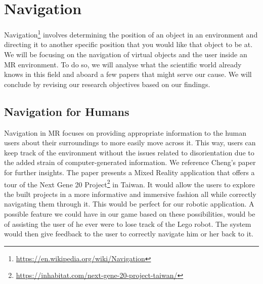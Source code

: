 \section{Navigation}
Navigation\footnote{\protect\url{https://en.wikipedia.org/wiki/Navigation}} involves determining the position of an object in an environment and directing it to another specific position that you would like that object to be at. We will be focusing on the navigation of virtual objects and the user inside an MR environment. To do so, we will analyse what the scientific world already knows in this field and aboard a few papers that might serve our cause. We will conclude by revising our research objectives based on our findings.

\subsection{Navigation for Humans}
Navigation in MR focuses on providing appropriate information to the human users about their surroundings to more easily move across it. This way, users can keep track of the environment without the issues related to disorientation due to the added strain of computer-generated information.\newline
We reference Cheng's paper\cite{chen2009intuitive} for further insights. The paper presents a Mixed Reality application that offers a tour of the Next Gene 20 Project\footnote{\protect\url{https://inhabitat.com/next-gene-20-project-taiwan/}\label{project}} in Taiwan. It would allow the users to explore the built projects in a more informative and immersive fashion all while correctly navigating them through it. This would be perfect for our robotic application. A possible feature we could have in our game based on these possibilities, would be of assisting the user of he ever were to lose track of the Lego robot. The system would then give feedback to the user to correctly navigate him or her back to it.

